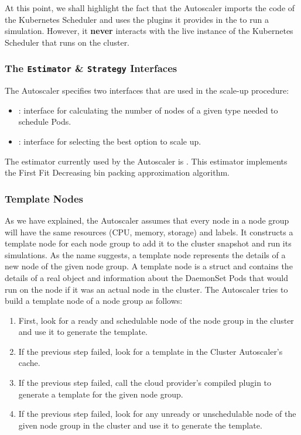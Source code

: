 At this point, we shall highlight the fact that the Autoscaler imports the code
of the Kubernetes Scheduler and uses the  plugins it provides in the
 to run a simulation. However, it
\textbf{never} interacts with the live instance of the Kubernetes Scheduler that
runs on the cluster.

\subsubsection{The \texttt{Estimator} \& \texttt{Strategy} Interfaces}

The Autoscaler specifies two interfaces that are used in the scale-up procedure:
\begin{itemize}
      \tightlist
      \item {}: interface for calculating the number of nodes of a
            given type needed to schedule Pods.
      \item {}: interface for selecting the best option to scale up.
\end{itemize}


The estimator currently used by the Autoscaler is .
This estimator implements the First Fit Decreasing bin packing approximation
algorithm.


\subsubsection{Template Nodes}
\label{section:design-template}

As we have explained, the Autoscaler assumes that every node in a node group
will have the same resources (CPU, memory, storage) and labels. It constructs a
template node for each node group to add it to the cluster snapshot and run its
simulations. As the name suggests, a template node represents the details of a
new node of the given node group. A template node is a  struct and
contains the details of a real  object and information about the DaemonSet
Pods that would run on the node if it was an actual node in the cluster. The
Autoscaler tries to build a template node of a node group as follows:

\begin{enumerate}
      \tightlist
      \item First, look for a ready and schedulable node of the node group in
            the cluster and use it to generate the template.
      \item If the previous step failed, look for a template in the Cluster
            Autoscaler's cache.
      \item If the previous step failed, call the cloud provider's compiled
            plugin to generate a template for the given node group.
      \item If the previous step failed, look for any unready or unschedulable
            node of the given node group in the cluster and use it to generate
            the template.
\end{enumerate}


